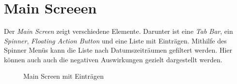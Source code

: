 \documentclass[
    DIV12,
    cleardouble=plain,
    headings=normal,
    pdftex,
    headexclude,footexclude,
    final
]{scrreprt}
\begin{document}
\newpage

\section{Main Screeen}
Der \textit{Main Screen} zeigt verschiedene Elemente. Darunter ist eine \textit{Tab Bar}, ein \textit{Spinner}, \textit{Floating Action Button} und eine Liste mit Einträgen. Mithilfe des Spinner Menüs kann die Liste nach Datumszeiträumen gefiltert werden. Hier können auch auch die negativen Auswirkungen gezielt dargestellt werden.
\begin{figure}[H]
	\centering
	\caption{Main Screen mit Einträgen}
	\label{mainscreen}
\end{figure}
\newpage
\end{document}
